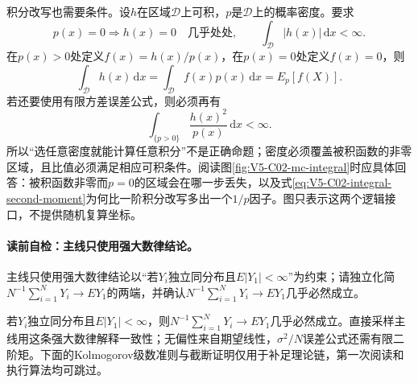 积分改写也需要条件。设$h$在区域$\mathcal D$上可积，$p$是$\mathcal D$上的概率密度。要求
\begin{equation}\label{eq:V5-C02-integral-support}
p(x)=0\Longrightarrow h(x)=0\quad\text{几乎处处},
\qquad \int_{\mathcal D}|h(x)|\,\mathrm dx<\infty.
\end{equation}
在$p(x)>0$处定义$f(x)=h(x)/p(x)$，在$p(x)=0$处定义$f(x)=0$，则
\begin{equation}\label{eq:V5-C02-integral-expectation}
\int_{\mathcal D}h(x)\,\mathrm dx
=\int_{\mathcal D}f(x)p(x)\,\mathrm dx
=E_p[f(X)].
\end{equation}
若还要使用有限方差误差公式，则必须再有
\begin{equation}\label{eq:V5-C02-integral-second-moment}
\int_{\{p>0\}}\frac{h(x)^2}{p(x)}\,\mathrm dx<\infty.
\end{equation}
所以“选任意密度就能计算任意积分”不是正确命题；密度必须覆盖被积函数的非零区域，且比值必须满足相应可积条件。阅读图\ref{fig:V5-C02-mc-integral}时应具体回答：被积函数非零而$p=0$的区域会在哪一步丢失，以及式\eqref{eq:V5-C02-integral-second-moment}为何比一阶积分改写多出一个$1/p$因子。图只表示这两个逻辑接口，不提供随机复算坐标。


\label{struct:V5-C02-CH12}
\paragraph{读前自检：主线只使用强大数律结论。}主线只使用强大数律结论以“若$Y_i$独立同分布且$E|Y_1|<\infty$”为约束；请独立化简$N^{-1}\sum_{i=1}^NY_i\to EY_1$的两端，并确认$N^{-1}\sum_{i=1}^NY_i\to EY_1$几乎必然成立。\par

\begin{keypointbox}[title=主线只使用强大数律结论]
若$Y_i$独立同分布且$E|Y_1|<\infty$，则$N^{-1}\sum_{i=1}^NY_i\to EY_1$几乎必然成立。直接采样主线用这条强大数律解释一致性；无偏性来自期望线性，$\sigma^2/N$误差公式还需有限二阶矩。下面的Kolmogorov级数准则与截断证明仅用于补足理论链，第一次阅读和执行算法均可跳过。
\end{keypointbox}
